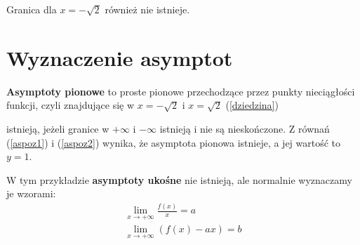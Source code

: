 \documentclass[10pt]{article}
\begin{document}
\noindent Granica dla $x = - \sqrt{2}$ również nie istnieje.

\section{Wyznaczenie asymptot}

{\bf Asymptoty pionowe} to proste pionowe przechodzące przez punkty nieciągłości funkcji, czyli znajdujące się w $x=-\sqrt{2}$ i $x=\sqrt{2}$ (\ref{dziedzina})

 istnieją, jeżeli granice w $+\infty$ i $-\infty$ istnieją i nie są nieskończone. Z równań (\ref{aspoz1}) i (\ref{aspoz2}) wynika, że asymptota pionowa istnieje, a jej wartość to $y=1$.

\noindent W tym przykładzie {\bf asymptoty ukośne} nie istnieją, ale normalnie wyznaczamy je wzorami: 
{\large \begin{eqnarray*}
\lim_{x\to +\infty}\frac{f(x)}{x} = a \\
\lim_{x\to +\infty}(f(x)-ax) = b \\
\end{eqnarray*}} \\
\end{document}
